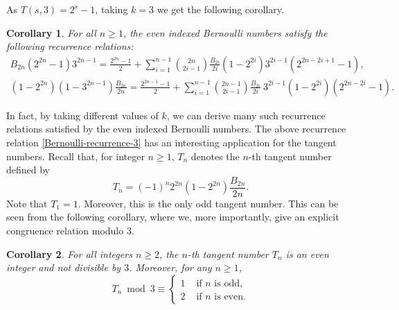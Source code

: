 \documentclass[12pt]{amsart}
\newtheorem{thm}{Theorem}
\newtheorem{cor}{Corollary}
\newcommand{\thmref}[1]{Theorem~\ref{#1}}
\begin{document}
As $T(s,3)=2^s-1$, taking $k=3$ we get the following corollary.
\begin{cor}\label{k=3}
For all $n\geq 1$, the even indexed Bernoulli numbers satisfy the following recurrence relations:
\begin{align}\label{Bernoulli-recurrence-3}
B_{2n}(2^{2n}-1)3^{2n-1}=\frac{2^{2n}-1}{2}+\sum_{i=1}^{n-1}\binom{2n}{2i-1}\frac{B_{2i}}{2i}(1-2^{2i})3^{2i-1}(2^{2n-2i+1}-1),
\end{align}
%
\begin{align}\label{Bernoulli-recurrence-3}
(1-2^{2n})(1-3^{2n-1})\frac{B_{2n}}{2n}= \frac{2^{2n-1}-1}{2} +\sum_{i=1}^{n-1}\binom{2n-1}{2i-1}\frac{B_{2i}}{2i} \ 3^{2i-1}(1-2^{2i})(2^{2n-2i}-1).
\end{align}
\end{cor}

In fact, by taking different values of $k$, we can derive many such recurrence relations satisfied by
the even indexed Bernoulli numbers. The above recurrence relation \eqref{Bernoulli-recurrence-3} has an interesting application for the
tangent numbers. Recall that, for integer $n\geq 1$, $T_n$ denotes the $n$-th tangent number defined by
$$
T_n=(-1)^{n}2^{2n}(1-2^{2n})\frac{B_{2n}}{2n}.
$$
Note that $T_1=1$. Moreover, this is the only odd tangent number. This can be seen from the following corollary,
where we, more importantly, give an explicit congruence relation modulo $3$.

\begin{cor}\label{cor-tangent}
For all integers $n\geq 2$, the $n$-th tangent number $T_n$ is an even integer and not divisible by $3$. Moreover, for any $n \ge 1$,
 $$
  T_n \bmod{3}\equiv
  \begin{cases}
   1   &  \text{ if  } n  \text{ is odd},\\
    2  & \text{ if } n  \text{ is even}.
  \end{cases}
  $$
\end{cor}
\end{document}
